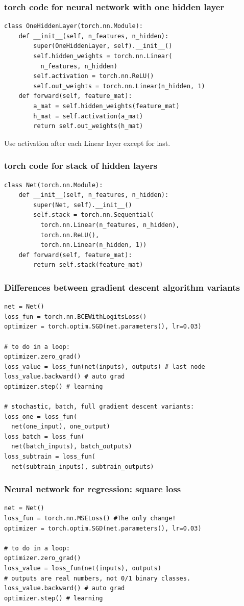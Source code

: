 \documentclass{beamer}
\begin{document}
\begin{frame}[fragile]
  \frametitle{torch code for neural network with one hidden layer}
\begin{verbatim}
class OneHiddenLayer(torch.nn.Module):
    def __init__(self, n_features, n_hidden):
        super(OneHiddenLayer, self).__init__()
        self.hidden_weights = torch.nn.Linear(
          n_features, n_hidden)
        self.activation = torch.nn.ReLU()
        self.out_weights = torch.nn.Linear(n_hidden, 1)
    def forward(self, feature_mat):
        a_mat = self.hidden_weights(feature_mat)
        h_mat = self.activation(a_mat)
        return self.out_weights(h_mat)
\end{verbatim}

Use activation after each Linear layer except for last.
\end{frame}

\begin{frame}[fragile]
  \frametitle{torch code for stack of hidden layers}
\begin{verbatim}
class Net(torch.nn.Module):
    def __init__(self, n_features, n_hidden):
        super(Net, self).__init__()
        self.stack = torch.nn.Sequential(
          torch.nn.Linear(n_features, n_hidden),
          torch.nn.ReLU(),
          torch.nn.Linear(n_hidden, 1))
    def forward(self, feature_mat):
        return self.stack(feature_mat)
\end{verbatim}
\end{frame}

\begin{frame}[fragile]
  \frametitle{Differences between gradient descent algorithm variants}

\begin{verbatim}
net = Net()
loss_fun = torch.nn.BCEWithLogitsLoss()
optimizer = torch.optim.SGD(net.parameters(), lr=0.03)

# to do in a loop:
optimizer.zero_grad()
loss_value = loss_fun(net(inputs), outputs) # last node
loss_value.backward() # auto grad
optimizer.step() # learning

# stochastic, batch, full gradient descent variants:
loss_one = loss_fun(
  net(one_input), one_output)
loss_batch = loss_fun(
  net(batch_inputs), batch_outputs)
loss_subtrain = loss_fun(
  net(subtrain_inputs), subtrain_outputs)
\end{verbatim}

\end{frame}


\begin{frame}[fragile]
  \frametitle{Neural network for regression: square loss}

\begin{verbatim}
net = Net()
loss_fun = torch.nn.MSELoss() #The only change!
optimizer = torch.optim.SGD(net.parameters(), lr=0.03)

# to do in a loop:
optimizer.zero_grad()
loss_value = loss_fun(net(inputs), outputs) 
# outputs are real numbers, not 0/1 binary classes.
loss_value.backward() # auto grad
optimizer.step() # learning
\end{verbatim}

\end{frame}
\end{document}

